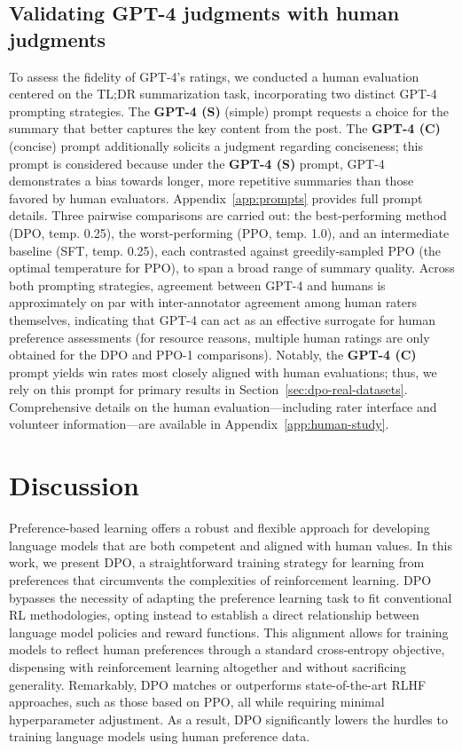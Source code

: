 \subsection{Validating GPT-4 judgments with human judgments}
\label{sec:human-judgments}

To assess the fidelity of GPT-4’s ratings, we conducted a human evaluation centered on the TL;DR summarization task, incorporating two distinct GPT-4 prompting strategies. The \textbf{GPT-4 (S)} (simple) prompt requests a choice for the summary that better captures the key content from the post. The \textbf{GPT-4 (C)} (concise) prompt additionally solicits a judgment regarding conciseness; this prompt is considered because under the \textbf{GPT-4 (S)} prompt, GPT-4 demonstrates a bias towards longer, more repetitive summaries than those favored by human evaluators. Appendix~\ref{app:prompts} provides full prompt details. Three pairwise comparisons are carried out: the best-performing method (DPO, temp. 0.25), the worst-performing (PPO, temp. 1.0), and an intermediate baseline (SFT, temp. 0.25), each contrasted against greedily-sampled PPO (the optimal temperature for PPO), to span a broad range of summary quality. Across both prompting strategies, agreement between GPT-4 and humans is approximately on par with inter-annotator agreement among human raters themselves, indicating that GPT-4 can act as an effective surrogate for human preference assessments (for resource reasons, multiple human ratings are only obtained for the DPO and PPO-1 comparisons). Notably, the \textbf{GPT-4 (C)} prompt yields win rates most closely aligned with human evaluations; thus, we rely on this prompt for primary results in Section~\ref{sec:dpo-real-datasets}. Comprehensive details on the human evaluation—including rater interface and volunteer information—are available in Appendix~\ref{app:human-study}.

\section{Discussion}
Preference-based learning offers a robust and flexible approach for developing language models that are both competent and aligned with human values. In this work, we present DPO, a straightforward training strategy for learning from preferences that circumvents the complexities of reinforcement learning. DPO bypasses the necessity of adapting the preference learning task to fit conventional RL methodologies, opting instead to establish a direct relationship between language model policies and reward functions. This alignment allows for training models to reflect human preferences through a standard cross-entropy objective, dispensing with reinforcement learning altogether and without sacrificing generality. Remarkably, DPO matches or outperforms state-of-the-art RLHF approaches, such as those based on PPO, all while requiring minimal hyperparameter adjustment. As a result, DPO significantly lowers the hurdles to training language models using human preference data.

